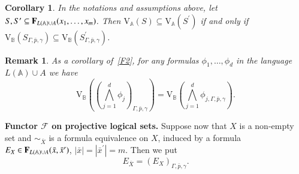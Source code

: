 \documentclass[12pt]{article}
\newtheorem{corollary}{Corollary}
\newtheorem{remark}{Remark}
\theoremstyle{definition}
\def\MA{{\mathbb{A}}}
\def\MB{{\mathbb{B}}}
\def\F{{\mathcal{F}}}
\def\V{{\mathrm{V}}}
\begin{document}
\begin{corollary}\label{cor:subset0}
In the notations and assumptions above, let  $S,S^\prime\subseteq {\bf F}_{L(\MA)\cup A}(x_1,\ldots,x_m)$. Then $\V_\MA(S)\subseteq \V_\MA(S^\prime)$ if and only if $\V_\MB(S_{\Gamma,\bar p,\gamma})\subseteq\V_\MB(S^\prime_{\Gamma,\bar p,\gamma})$.
\end{corollary}

\begin{remark}\label{cor:wedge0}
As a corollary of~\ref{F2}, for any formulas $\phi_1,\ldots,\phi_d$ in the language $L(\MA)\cup A$ we have 
\begin{equation*}
 \V_\MB((\bigwedge\limits_{j=1}^d \phi_j)_{\Gamma,\bar p,\gamma})=\V_\MB(\bigwedge\limits_{j=1}^d \phi_{j,\Gamma,\bar p,\gamma}).
\end{equation*}
\end{remark}

{\bf Functor $\F$ on projective logical sets.} 
Suppose now that $X$ is a non-empty set and $\sim_{\bar X}$ is a formula equivalence on $X$, induced by a formula $E_X\in {\bf F}_{L(\MA)\cup A}(\bar x,\bar x^\prime)$, $|\bar x|=|\bar x^\prime|=m$. Then we put
$$
E_{\bar X}=(E_X)_{\Gamma, \bar p, \gamma}.
$$
\end{document}
